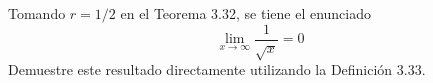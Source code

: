 \item Tomando $r = 1/2$ en el Teorema 3.32, se tiene el enunciado
    $$\lim_{x \to \infty} \frac{1}{\sqrt{x}} = 0$$
    Demuestre este resultado directamente utilizando la Definición 3.33.
